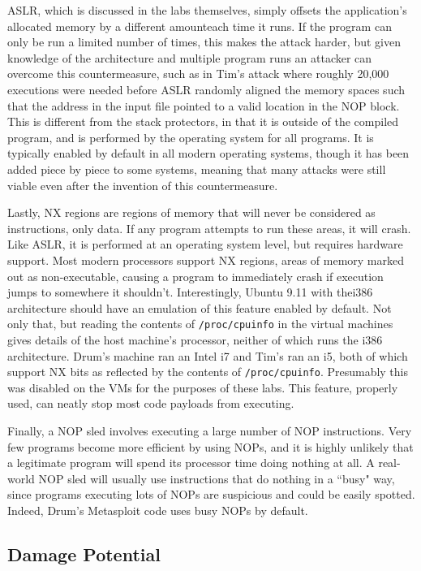 ASLR, which is discussed in the labs themselves, simply offsets the application's allocated memory by a different
amounteach time it runs. If the program can only be run a limited number of times, this makes the attack harder, but
given knowledge of the architecture and multiple program runs an attacker can overcome this countermeasure, such as in
Tim's attack where roughly 20,000 executions were needed before ASLR randomly aligned the memory spaces such that the
address in the input file pointed to a valid location in the NOP block. This is different from the stack protectors, in
that it is outside of the compiled program, and is performed by the operating system for all programs. It is typically
enabled by default in all modern operating systems, though it has been added piece by piece to some systems, meaning
that many attacks were still viable even after the invention of this countermeasure.\cite{wiki_aslr}

Lastly, NX regions\cite{wiki_nx} are regions of memory that will never be considered as instructions, only data. If any
program attempts to run these areas, it will crash. Like ASLR, it is performed at an operating system level, but
requires hardware support. Most modern processors support NX regions, areas of memory marked out as non-executable,
causing a program to immediately crash if execution jumps to somewhere it shouldn't. Interestingly, Ubuntu 9.11 with
thei386 architecture should have an emulation of this feature enabled by default\cite{nx_bit}. Not only that, but
reading the contents of {\tt /proc/cpuinfo} in the virtual machines gives details of the host machine's processor,
neither of which runs the i386 architecture. Drum's machine ran an Intel i7 and Tim's ran an i5, both of which support
NX bits as reflected by the contents of {\tt /proc/cpuinfo}. Presumably this was disabled on the VMs for the purposes of
these labs. This feature, properly used, can neatly stop most code payloads from executing.

Finally, a NOP sled involves executing a large number of NOP instructions. Very few programs become more efficient by
using NOPs\cite{zip_quine}, and it is highly unlikely that a legitimate program will spend its processor time doing
nothing at all. A real-world NOP sled will usually use instructions that do nothing in a ``busy" way\cite{wiki_sled},
since programs executing lots of NOPs are suspicious and could be easily spotted. Indeed, Drum's Metasploit code uses
busy NOPs by default.

\subsection{Damage Potential}

